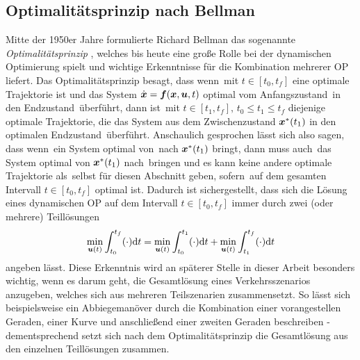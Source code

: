 \subsection{Optimalitätsprinzip nach Bellman}\label{subsec:Optimalitätsprinzip}
Mitte der 1950er Jahre formulierte Richard Bellman das sogenannte \textit{Optimalitätsprinzip} \cite{Bellman.1984}, welches bis heute eine große Rolle bei der dynamischen Optimierung spielt und wichtige Erkenntnisse für die Kombination mehrerer \gls{OP} liefert. Das Optimalitätsprinzip besagt, dass wenn \uoptoft\,mit $t\in[t_0, t_f]$ eine optimale Trajektorie ist und das System $\dot{\boldsymbol{x}} = \boldsymbol{f}(\boldsymbol{x},\boldsymbol{u},t)$ optimal vom Anfangszustand \xoftzero\,in den Endzustand \xoptoftf\,überführt, dann ist \uoptoft\,mit $t\in[t_1, t_f],\, t_0\leq t_1\leq t_f$ diejenige optimale Trajektorie, die das System aus dem Zwischenzustand ${\boldsymbol{x}}^*(t_1)$ in den optimalen Endzustand \xoptoftf\,überführt. Anschaulich gesprochen lässt sich also sagen, dass wenn \uoptoft\,ein System optimal von \xoftzero\,nach ${\boldsymbol{x}}^*(t_1)$ bringt, dann muss auch \uoptoft\,das System optimal von ${\boldsymbol{x}}^*(t_1)$ nach \xoptoftf\,bringen und es kann keine andere optimale Trajektorie als \uoptoft\,selbst für diesen Abschnitt geben, sofern \uoptoft\,auf dem gesamten Intervall $t\in[t_0, t_f]$ optimal ist. Dadurch ist sichergestellt, dass sich die Lösung eines dynamischen \gls{OP} auf dem Intervall $t\in[t_0, t_f]$ immer durch zwei (oder mehrere) Teillösungen 
\begin{equation}
	\min_{\boldsymbol{u}(t)} \int_{t_0}^{t_f}(\cdot)\textrm{d}{t} = \min_{\boldsymbol{u}(t)} \int_{t_0}^{t_1}(\cdot)\textrm{d}{t} + \min_{\boldsymbol{u}(t)} \int_{t_1}^{t_f}(\cdot)\textrm{d}{t}
\end{equation}
angeben lässt. Diese Erkenntnis wird an späterer Stelle in dieser Arbeit besonders wichtig, wenn es darum geht, die Gesamtlösung eines Verkehrsszenarios anzugeben, welches sich aus mehreren Teilszenarien zusammensetzt. So lässt sich beispielsweise ein Abbiegemanöver durch die Kombination einer vorangestellen Geraden, einer Kurve und anschließend einer zweiten Geraden beschreiben - dementsprechend setzt sich nach dem Optimalitätsprinzip die Gesamtlösung aus den einzelnen Teillösungen zusammen.
